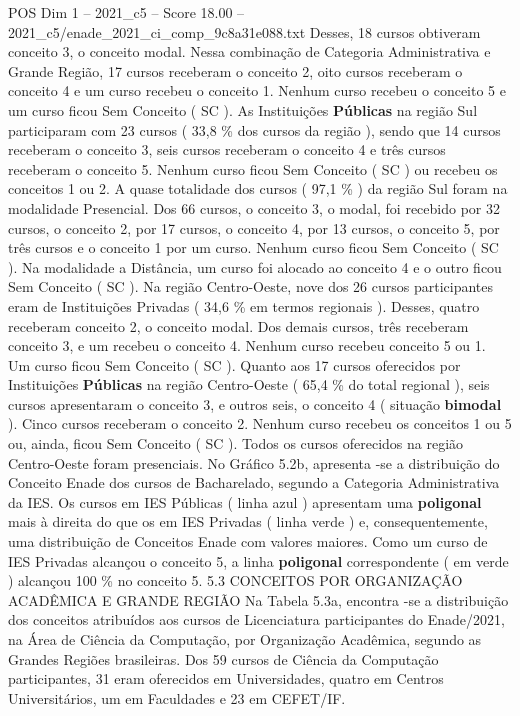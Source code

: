 \begin{textsample}{POS Dim 1 – 2021\_c5 – Score 18.00 – 2021\_c5/enade\_2021\_ci\_comp\_9c8a31e088.txt}
Desses, 18 cursos obtiveram conceito 3, o conceito modal.
Nessa combinação de Categoria Administrativa e Grande Região, 17 cursos receberam o conceito 2, oito cursos receberam o conceito 4 e um curso recebeu o conceito 1.
Nenhum curso recebeu o conceito 5 e um curso ficou Sem Conceito ( SC ).
As Instituições \textbf{Públicas} na região Sul participaram com 23 cursos ( 33,8 \% dos cursos da região ), sendo que 14 cursos receberam o conceito 3, seis cursos receberam o conceito 4 e três cursos receberam o conceito 5.
Nenhum curso ficou Sem Conceito ( SC ) ou recebeu os conceitos 1 ou 2.
A quase totalidade dos cursos ( 97,1 \% ) da região Sul foram na modalidade Presencial.
Dos 66 cursos, o conceito 3, o modal, foi recebido por 32 cursos, o conceito 2, por 17 cursos, o conceito 4, por 13 cursos, o conceito 5, por três cursos e o conceito 1 por um curso.
Nenhum curso ficou Sem Conceito ( SC ).
Na modalidade a Distância, um curso foi alocado ao conceito 4 e o outro ficou Sem Conceito ( SC ).
Na região Centro-Oeste, nove dos 26 cursos participantes eram de Instituições Privadas ( 34,6 \% em termos regionais ).
Desses, quatro receberam conceito 2, o conceito modal.
Dos demais cursos, três receberam conceito 3, e um recebeu o conceito 4.
Nenhum curso recebeu conceito 5 ou 1.
Um curso ficou Sem Conceito ( SC ).
Quanto aos 17 cursos oferecidos por Instituições \textbf{Públicas} na região Centro-Oeste ( 65,4 \% do total regional ), seis cursos apresentaram o conceito 3, e outros seis, o conceito 4 ( situação \textbf{bimodal} ).
Cinco cursos receberam o conceito 2.
Nenhum curso recebeu os conceitos 1 ou 5 ou, ainda, ficou Sem Conceito ( SC ).
Todos os cursos oferecidos na região Centro-Oeste foram presenciais.
No Gráfico 5.2b, apresenta -se a distribuição do Conceito Enade dos cursos de Bacharelado, segundo a Categoria Administrativa da IES.
Os cursos em IES Públicas ( linha azul ) apresentam uma \textbf{poligonal} mais à direita do que os em IES Privadas ( linha verde ) e, consequentemente, uma distribuição de Conceitos Enade com valores maiores.
Como um curso de IES Privadas alcançou o conceito 5, a linha \textbf{poligonal} correspondente ( em verde ) alcançou 100 \% no conceito 5. 5.3 CONCEITOS POR ORGANIZAÇÃO ACADÊMICA E GRANDE REGIÃO Na Tabela 5.3a, encontra -se a distribuição dos conceitos atribuídos aos cursos de Licenciatura participantes do Enade/2021, na Área de Ciência da Computação, por Organização Acadêmica, segundo as Grandes Regiões brasileiras.
Dos 59 cursos de Ciência da Computação participantes, 31 eram oferecidos em Universidades, quatro em Centros Universitários, um em Faculdades e 23 em CEFET/IF.

\end{textsample}

